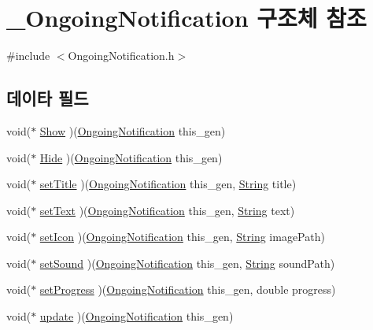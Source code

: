 \hypertarget{struct___ongoing_notification}{\section{\-\_\-\-Ongoing\-Notification 구조체 참조}
\label{struct___ongoing_notification}
}


{\ttfamily \#include $<$Ongoing\-Notification.\-h$>$}

\subsection*{데이타 필드}
\begin{DoxyCompactItemize}
\item 
void($\ast$ \hyperlink{struct___ongoing_notification_af3f0ea7c9764813a55482dae3bcf5037}{Show} )(\hyperlink{_ongoing_notification_8h_a5e36b6a63a0cd1507baf647736b76ac4}{Ongoing\-Notification} this\-\_\-gen)
\item 
void($\ast$ \hyperlink{struct___ongoing_notification_afdc0b8cac867cd63e7160f849629b7d2}{Hide} )(\hyperlink{_ongoing_notification_8h_a5e36b6a63a0cd1507baf647736b76ac4}{Ongoing\-Notification} this\-\_\-gen)
\item 
void($\ast$ \hyperlink{struct___ongoing_notification_a1603dddb1e9306dd04f416ec71e353b7}{set\-Title} )(\hyperlink{_ongoing_notification_8h_a5e36b6a63a0cd1507baf647736b76ac4}{Ongoing\-Notification} this\-\_\-gen, \hyperlink{dit_8h_a2efe6d463d80744789f228f5dc4baa39}{String} title)
\item 
void($\ast$ \hyperlink{struct___ongoing_notification_a00acfb78dfd3520407a0da33290f67b6}{set\-Text} )(\hyperlink{_ongoing_notification_8h_a5e36b6a63a0cd1507baf647736b76ac4}{Ongoing\-Notification} this\-\_\-gen, \hyperlink{dit_8h_a2efe6d463d80744789f228f5dc4baa39}{String} text)
\item 
void($\ast$ \hyperlink{struct___ongoing_notification_a2df14bd8a05050bcf5225169cbaf94d4}{set\-Icon} )(\hyperlink{_ongoing_notification_8h_a5e36b6a63a0cd1507baf647736b76ac4}{Ongoing\-Notification} this\-\_\-gen, \hyperlink{dit_8h_a2efe6d463d80744789f228f5dc4baa39}{String} image\-Path)
\item 
void($\ast$ \hyperlink{struct___ongoing_notification_aa822ce12ab238447d07f6821629dfaaf}{set\-Sound} )(\hyperlink{_ongoing_notification_8h_a5e36b6a63a0cd1507baf647736b76ac4}{Ongoing\-Notification} this\-\_\-gen, \hyperlink{dit_8h_a2efe6d463d80744789f228f5dc4baa39}{String} sound\-Path)
\item 
void($\ast$ \hyperlink{struct___ongoing_notification_afddc1bda00e4242433a486881aed226c}{set\-Progress} )(\hyperlink{_ongoing_notification_8h_a5e36b6a63a0cd1507baf647736b76ac4}{Ongoing\-Notification} this\-\_\-gen, double progress)
\item 
void($\ast$ \hyperlink{struct___ongoing_notification_ae5eaf248602ec0edb1334d47d959f0e9}{update} )(\hyperlink{_ongoing_notification_8h_a5e36b6a63a0cd1507baf647736b76ac4}{Ongoing\-Notification} this\-\_\-gen)
\end{DoxyCompactItemize}


